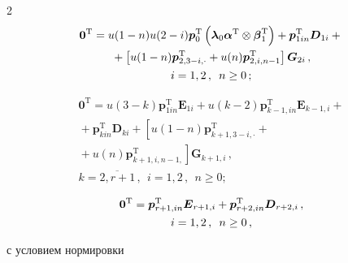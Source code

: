 \begin{multicols}{2}
\begin{multline}

\boldsymbol{0}^{\mathrm{T}}=u(1-n)u(2-i)\boldsymbol{p}_0^{\mathrm{T}} \left(\boldsymbol{\lambda}_0\boldsymbol{\alpha}^{\mathrm{T}} \otimes\boldsymbol{\beta}_1^{\mathrm{T}}\right)+\boldsymbol{p}_{1in}^{\mathrm{T}}\boldsymbol{D}_{1i}+{}\\

{}+\left[u(1-n)\boldsymbol{p}^{\mathrm{T}}_{2,3-i,\cdot}+ u(n)\boldsymbol{p}^{\mathrm{T}}_{2,i,n-1}\right]

\boldsymbol{G}_{2i}\,,\\

 i=1,2\,,\enskip n\geq 0\,;

\label{eq:2}

\end{multline}

\begin{multline}

\label{eq:3}

\boldsymbol{0}^{\mathrm{T}}=u(3-k)\boldsymbol{p}_{1in}^{\mathrm{T}}\boldsymbol{E}_{1i}+

u(k-2)\boldsymbol{p}_{k-1,in}^{\mathrm{T}}\boldsymbol{E}_{k-1,i}+{}\\

{}+\boldsymbol{p}_{kin}^{\mathrm{T}}\boldsymbol{D}_{ki}+

\left[u(1-n)\boldsymbol{p}_{k+1,3-i,\cdot}^{\mathrm{T}}+{}\right.\\

{}+\left. u(n)\boldsymbol{p}_{k+1,i,n-1,}^{\mathrm{T}}\right]\boldsymbol{G}_{k+1,i}\,,\\

k=\overline{2,r+1}\,,\ \  i=1,2\,,\ \ n\geq 0;

\end{multline}

\begin{multline}

\label{eq:4}

\boldsymbol{0}^{\mathrm{T}}=\boldsymbol{p}_{r+1,in}^{\mathrm{T}}\boldsymbol{E}_{r+1,i}+

\boldsymbol{p}_{r+2,in}^{\mathrm{T}}\boldsymbol{D}_{r+2,i}\,,\\ i=1,2\,,\enskip n\geq 0\,,

\end{multline}

с условием нормировки

\begin{equation}


\end{equation}
\end{multicols}

